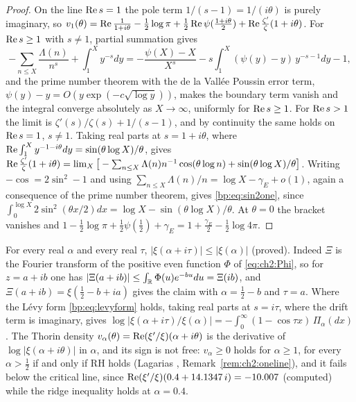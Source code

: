 \begin{proof}
On the line $\operatorname{Re} s=1$ the pole term $1/(s-1)=1/(i\theta)$ is purely imaginary, so $v_1(\theta)=\operatorname{Re}\frac1{1+i\theta}-\frac12\log\pi+\frac12\operatorname{Re}\psi(\frac{1+i\theta}2)+\operatorname{Re}\frac{\zeta'}{\zeta}(1+i\theta)$. For $\operatorname{Re} s\ge1$ with $s\ne1$, partial summation gives
\[
-\sum_{n\le X}\frac{\Lambda(n)}{n^s}+\int_1^Xy^{-s}dy=-\frac{\psi(X)-X}{X^s}-s\int_1^X(\psi(y)-y)\,y^{-s-1}dy-1,
\]
and the prime number theorem with the de la Vall\'ee Poussin error term, $\psi(y)-y=O(y\exp(-c\sqrt{\log y}))$, makes the boundary term vanish and the integral converge absolutely as $X\to\infty$, uniformly for $\operatorname{Re} s\ge1$. For $\operatorname{Re} s>1$ the limit is $\zeta'(s)/\zeta(s)+1/(s-1)$, and by continuity the same holds on $\operatorname{Re} s=1$, $s\ne1$. Taking real parts at $s=1+i\theta$, where $\operatorname{Re}\int_1^Xy^{-1-i\theta}dy=\sin(\theta\log X)/\theta$, gives $\operatorname{Re}\frac{\zeta'}{\zeta}(1+i\theta)=\lim_X\big[-\sum_{n\le X}\Lambda(n)n^{-1}\cos(\theta\log n)+\sin(\theta\log X)/\theta\big]$. Writing $-\cos=2\sin^2-1$ and using $\sum_{n\le X}\Lambda(n)/n=\log X-\gamma_E+o(1)$, again a consequence of the prime number theorem, gives \eqref{bp:eq:sin2one}, since $\int_0^{\log X}2\sin^2(\theta x/2)dx=\log X-\sin(\theta\log X)/\theta$. At $\theta=0$ the bracket vanishes and $1-\frac12\log\pi+\frac12\psi(\frac12)+\gamma_E=1+\frac{\gamma_E}2-\frac12\log4\pi$.
\end{proof}

\begin{remark}\label{xi:rem:ridge}
For every real $\alpha$ and every real $\tau$, $|\xi(\alpha+i\tau)|\le|\xi(\alpha)|$ (proved). Indeed $\Xi$ is the Fourier transform of the positive even function $\Phi$ of \eqref{eq:ch2:Phi}, so for $z=a+ib$ one has $|\Xi(a+ib)|\le\int_{\mathbb{R}}\Phi(u)e^{-bu}du=\Xi(ib)$, and $\Xi(a+ib)=\xi(\frac12-b+ia)$ gives the claim with $\alpha=\frac12-b$ and $\tau=a$. Where the L\'evy form \eqref{bp:eq:levyform} holds, taking real parts at $s=i\tau$, where the drift term is imaginary, gives $\log|\xi(\alpha+i\tau)/\xi(\alpha)|=-\int_0^\infty(1-\cos\tau x)\,\Pi_\alpha(dx)$. The Thorin density $v_\alpha(\theta)=\operatorname{Re}(\xi'/\xi)(\alpha+i\theta)$ is the derivative of $\log|\xi(\alpha+i\theta)|$ in $\alpha$, and its sign is not free: $v_\alpha\ge0$ holds for $\alpha\ge1$, for every $\alpha>\frac12$ if and only if RH holds (Lagarias \cite{Lagarias}, Remark~\ref{rem:ch2:oneline}), and it fails below the critical line, since $\operatorname{Re}(\xi'/\xi)(0.4+14.1347\,i)=-10.007$ (computed) while the ridge inequality holds at $\alpha=0.4$.
\end{remark}

